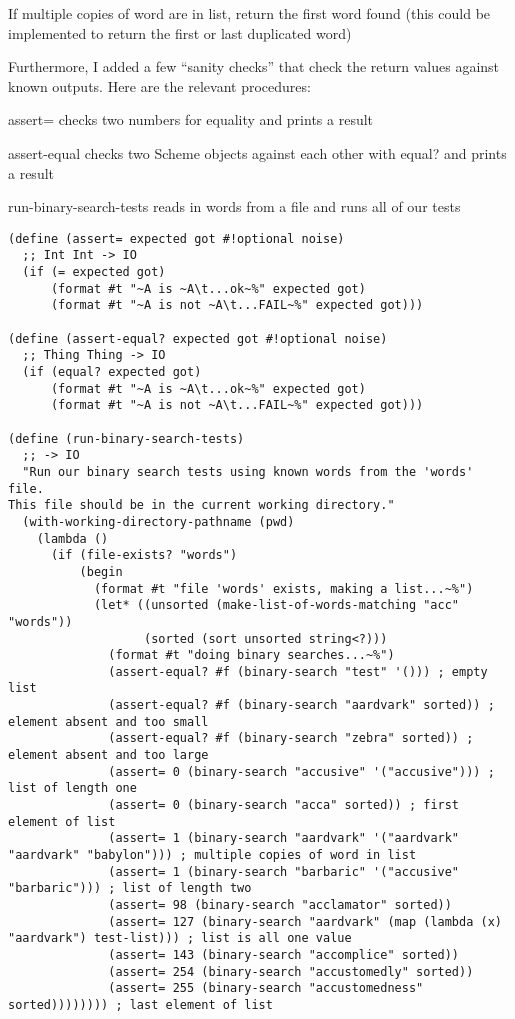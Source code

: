 \documentclass[12pt,openright,draft]{book}
\begin{document}
If multiple copies of word are in list, return the first word found
(this could be implemented to return the first or last duplicated
word)

Furthermore, I added a few ``sanity checks'' that check the return
values against known outputs. Here are the relevant procedures:

assert= checks two numbers for equality and prints a result

assert-equal checks two Scheme objects against each other with equal?
and prints a result

run-binary-search-tests reads in words from a file and runs all of our
tests

\begin{verbatim}
(define (assert= expected got #!optional noise)
  ;; Int Int -> IO
  (if (= expected got)
      (format #t "~A is ~A\t...ok~%" expected got)
      (format #t "~A is not ~A\t...FAIL~%" expected got)))

(define (assert-equal? expected got #!optional noise)
  ;; Thing Thing -> IO
  (if (equal? expected got)
      (format #t "~A is ~A\t...ok~%" expected got)
      (format #t "~A is not ~A\t...FAIL~%" expected got)))

(define (run-binary-search-tests)
  ;; -> IO
  "Run our binary search tests using known words from the 'words' file.
This file should be in the current working directory."
  (with-working-directory-pathname (pwd)
    (lambda ()
      (if (file-exists? "words")
          (begin
            (format #t "file 'words' exists, making a list...~%")
            (let* ((unsorted (make-list-of-words-matching "acc" "words"))
                   (sorted (sort unsorted string<?)))
              (format #t "doing binary searches...~%")
              (assert-equal? #f (binary-search "test" '())) ; empty list
              (assert-equal? #f (binary-search "aardvark" sorted)) ; element absent and too small
              (assert-equal? #f (binary-search "zebra" sorted)) ; element absent and too large
              (assert= 0 (binary-search "accusive" '("accusive"))) ; list of length one
              (assert= 0 (binary-search "acca" sorted)) ; first element of list
              (assert= 1 (binary-search "aardvark" '("aardvark" "aardvark" "babylon"))) ; multiple copies of word in list
              (assert= 1 (binary-search "barbaric" '("accusive" "barbaric"))) ; list of length two
              (assert= 98 (binary-search "acclamator" sorted))
              (assert= 127 (binary-search "aardvark" (map (lambda (x) "aardvark") test-list))) ; list is all one value
              (assert= 143 (binary-search "accomplice" sorted))
              (assert= 254 (binary-search "accustomedly" sorted))
              (assert= 255 (binary-search "accustomedness" sorted)))))))) ; last element of list
\end{verbatim}
\end{document}
